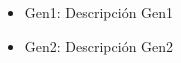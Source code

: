 \documentclass[10pt, a4paper]{article}
\begin{document}
\begin{framed}
\small
\begin{tad}{\tadNombre{}}

\tadGeneros{}

\tadObservadores

\begin{framed}
    \begin{itemize}
        \item Gen1: Descripci\'on Gen1
        \item Gen2: Descripci\'on Gen2
    \end{itemize}
\end{framed}

\tadGeneradores

\end{tad}
\smallskip
\end{framed}
\end{document}
